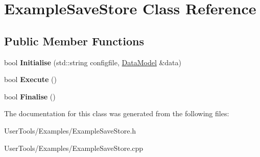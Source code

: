 \hypertarget{classExampleSaveStore}{
\section{ExampleSaveStore Class Reference}
\label{classExampleSaveStore}
}
\subsection*{Public Member Functions}
\begin{DoxyCompactItemize}
\item 
\hypertarget{classExampleSaveStore_a9c575471c5d024446e7b71b7340cc600}{
bool {\bfseries Initialise} (std::string configfile, \hyperlink{classDataModel}{DataModel} \&data)}
\label{classExampleSaveStore_a9c575471c5d024446e7b71b7340cc600}

\item 
\hypertarget{classExampleSaveStore_ab95ccff687c8114d6813a87c2bede948}{
bool {\bfseries Execute} ()}
\label{classExampleSaveStore_ab95ccff687c8114d6813a87c2bede948}

\item 
\hypertarget{classExampleSaveStore_aa28ea62a5f5bba4c04d271d502859e78}{
bool {\bfseries Finalise} ()}
\label{classExampleSaveStore_aa28ea62a5f5bba4c04d271d502859e78}

\end{DoxyCompactItemize}


The documentation for this class was generated from the following files:\begin{DoxyCompactItemize}
\item 
UserTools/Examples/ExampleSaveStore.h\item 
UserTools/Examples/ExampleSaveStore.cpp\end{DoxyCompactItemize}
